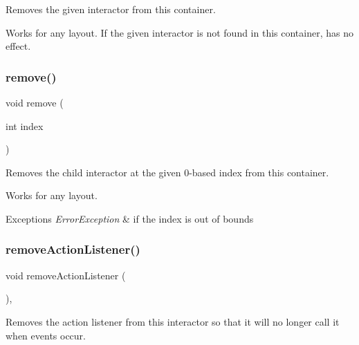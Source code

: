 Removes the given interactor from this container. 

Works for any layout. If the given interactor is not found in this container, has no effect. \mbox{\label{classsgl_1_1GContainer_a2ad1aa316f278b2e9fa8121504749652}} 
\subsubsection{\texorpdfstring{remove()}{remove()}\hspace{0.1cm}{\footnotesize\ttfamily [3/3]}}
{\footnotesize\ttfamily void remove (\begin{DoxyParamCaption}\item[{int}]{index }\end{DoxyParamCaption})\hspace{0.3cm}{\ttfamily [virtual]}}



Removes the child interactor at the given 0-\/based index from this container. 

Works for any layout. 
\begin{DoxyExceptions}{Exceptions}
{\em Error\+Exception} & if the index is out of bounds \\
\hline
\end{DoxyExceptions}
\mbox{\label{classsgl_1_1GInteractor_ab7fe7a876367b87cf7202f947f1d05e4}} 
\subsubsection{\texorpdfstring{remove\+Action\+Listener()}{removeActionListener()}}
{\footnotesize\ttfamily void remove\+Action\+Listener (\begin{DoxyParamCaption}{ }\end{DoxyParamCaption})\hspace{0.3cm}{\ttfamily [virtual]}, {\ttfamily [inherited]}}



Removes the action listener from this interactor so that it will no longer call it when events occur. 

